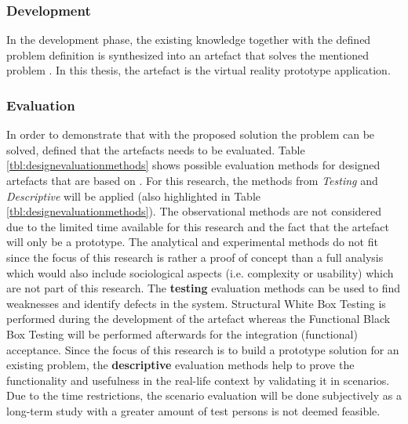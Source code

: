
\subsubsection{Development}

In the development phase, the existing knowledge together with the defined problem definition is synthesized into an artefact that solves the mentioned problem \citep{Vaishnavi2008}. In this thesis, the artefact is the virtual reality prototype application.



\subsubsection{Evaluation}

\label{EvaluationMethodology}

In order to demonstrate that with the proposed solution the problem can be solved, \cite{Hevner2010}  defined that the artefacts needs to be evaluated. Table \ref{tbl:designevaluationmethods} shows possible evaluation methods for designed artefacts that are based on \cite{Hevner2004}. \newline
For this research, the methods from \textit{Testing} and \textit{Descriptive} will be applied (also highlighted in Table \ref{tbl:designevaluationmethods}). The observational methods are not considered due to the limited time available for this research and the fact that the artefact will only be a prototype. The analytical and experimental methods do not fit since the focus of this research is rather a proof of concept than a full analysis which would also include sociological aspects (i.e. complexity or usability) which are not part of this research.\newline
The \textbf{testing} evaluation methods can be used to find weaknesses and identify defects in the system. Structural White Box Testing is performed during the development of the artefact whereas the Functional Black Box Testing will be performed afterwards for the integration (functional) acceptance. \newline
Since the focus of this research is to build a prototype solution for an existing problem, the \textbf{descriptive} evaluation methods help to prove the functionality and usefulness in the real-life context by validating it in scenarios. Due to the time restrictions, the scenario evaluation will be done subjectively as a long-term study with a greater amount of test persons is not deemed feasible.

